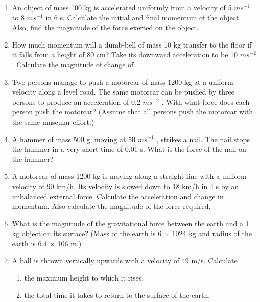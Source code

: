 \begin{enumerate}[label=\arabic*.,ref=\thesection.\theenumi]
\item  An object of mass 100 kg is accelerated uniformly from a velocity of 5 $m s^{-1}$
to 8 $m s^{-1}$ in 6 s. Calculate the initial and final
momentum of the object. Also, find the magnitude of the force exerted on the object.
\item  How much momentum will a dumb-bell of mass 10 kg transfer to the floor if it falls from a height of 80 cm? Take its downward acceleration to be 10 $m s^{-2}$. Calculate the magnitude of change of

\item Two persons manage to push a motorcar of mass 1200 kg at a uniform velocity along a level road. The same motorcar can be pushed by three persons to produce an acceleration of 0.2 $m s^{-2}$
. With what force does each person push the motorcar? (Assume that all persons push the motorcar with the same muscular effort.)
\item  A hammer of mass 500 g, moving at 50 $m s^{-1}$ , strikes a nail.
The nail stops the hammer in a very short time of 0.01 s. What is the force of the nail on the hammer?
\item  A motorcar of mass 1200 kg is moving along a straight line with a uniform velocity of 90 km/h. Its velocity is slowed down to 18 km/h in 4 s by an unbalanced external force. Calculate the acceleration and change in momentum. Also calculate the magnitude of the force required.
\item What is the magnitude of the gravitational force between the earth and a 1 kg object on its surface? (Mass of the earth is 6 $\times$ 1024 kg and radius of the earth is 6.4 $\times$ 106 m.)
\item A ball is thrown vertically upwards with a velocity of 49 m/s. Calculate

\begin{enumerate} 
\item  the maximum height to which it rises, 
\item the total time it takes to return to the surface of the earth.
\end{enumerate}


\end{enumerate}
